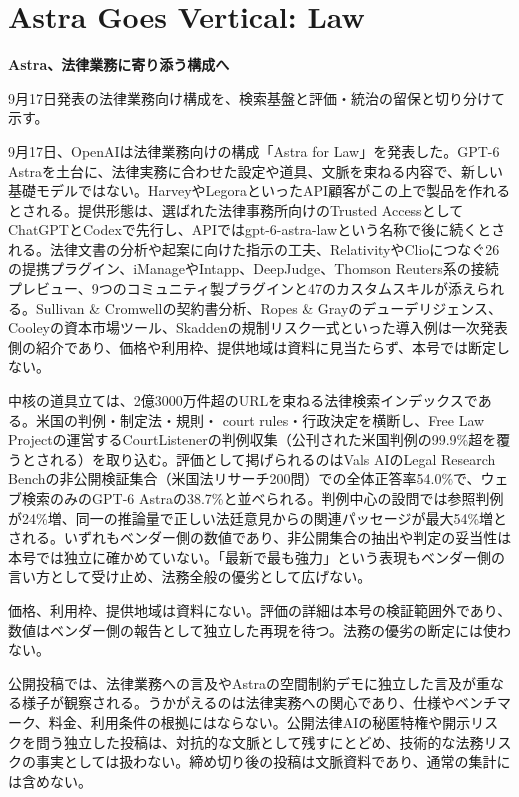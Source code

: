 \section{Astra Goes Vertical: Law}
\begin{wideflow}
{\Large\bfseries Astra、法律業務に寄り添う構成へ}\par
\smallskip
{\color{SurveyMuted}9月17日発表の法律業務向け構成を、検索基盤と評価・統治の留保と切り分けて示す。}\par
\end{wideflow}

9月17日、OpenAIは法律業務向けの構成「Astra for Law」を発表した\cite{astralaw}。GPT-6 Astraを土台に、法律実務に合わせた設定や道具、文脈を束ねる内容で、新しい基礎モデルではない。HarveyやLegoraといったAPI顧客がこの上で製品を作れるとされる。提供形態は、選ばれた法律事務所向けのTrusted AccessとしてChatGPTとCodexで先行し、APIではgpt-6-astra-lawという名称で後に続くとされる。法律文書の分析や起案に向けた指示の工夫、RelativityやClioにつなぐ26の提携プラグイン、iManageやIntapp、DeepJudge、Thomson Reuters系の接続プレビュー、9つのコミュニティ製プラグインと47のカスタムスキルが添えられる。Sullivan \& Cromwellの契約書分析、Ropes \& Grayのデューデリジェンス、Cooleyの資本市場ツール、Skaddenの規制リスク一式といった導入例は一次発表側の紹介であり、価格や利用枠、提供地域は資料に見当たらず、本号では断定しない。

中核の道具立ては、2億3000万件超のURLを束ねる法律検索インデックスである\cite{astralaw}。米国の判例・制定法・規則・ court rules・行政決定を横断し、Free Law Projectの運営するCourtListenerの判例収集（公刊された米国判例の99.9\%超を覆うとされる）を取り込む。評価として掲げられるのはVals AIのLegal Research Benchの非公開検証集合（米国法リサーチ200問）での全体正答率54.0\%で、ウェブ検索のみのGPT-6 Astraの38.7\%と並べられる。判例中心の設問では参照判例が24\%増、同一の推論量で正しい法廷意見からの関連パッセージが最大54\%増とされる。いずれもベンダー側の数値であり、非公開集合の抽出や判定の妥当性は本号では独立に確かめていない。「最新で最も強力」という表現もベンダー側の言い方として受け止め、法務全般の優劣として広げない。

\begin{claimboundary}[資料と評価の境界]
価格、利用枠、提供地域は資料にない。評価の詳細は本号の検証範囲外であり、数値はベンダー側の報告として独立した再現を待つ。法務の優劣の断定には使わない。
\end{claimboundary}

\begin{communitynote}
公開投稿では、法律業務への言及やAstraの空間制約デモに独立した言及が重なる様子が観察される\cite{w38x-law-summary,w38x-law-ind}。うかがえるのは法律実務への関心であり、仕様やベンチマーク、料金、利用条件の根拠にはならない。公開法律AIの秘匿特権や開示リスクを問う独立した投稿\cite{w38x-law-risk}は、対抗的な文脈として残すにとどめ、技術的な法務リスクの事実としては扱わない。締め切り後の投稿は文脈資料であり、通常の集計には含めない。
\end{communitynote}
